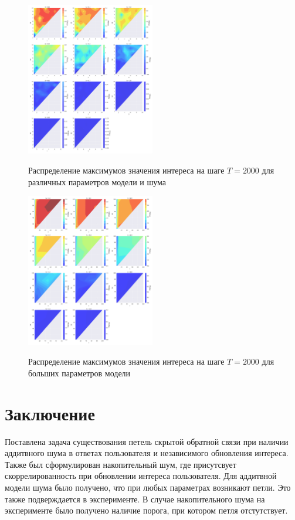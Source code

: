 \documentclass[12pt, twoside]{article}
\begin{document}
\begin{figure}[h]
  \begin{multicols}{2}
    \hfill
    \includegraphics[width=0.5\textwidth]{../figures/countour_Mlb.pdf}
    \hfill
    \caption{Распределение максимумов значения интереса на шаге $T=2000$ для различных параметров модели и шума}
    \label{fig5}
    \hfill
    \includegraphics[width=0.5\textwidth]{../figures/countour_big_Mlb.pdf}
    \hfill
    \caption{Распределение максимумов значения интереса на шаге $T=2000$ для больших параметров модели}
    \label{fig6}
  \end{multicols}
\end{figure}

\newpage

\section{Заключение}
Поставлена задача существования петель скрытой обратной связи при наличии аддитвного шума в ответах пользователя и независимого обновления интереса.
Также был сформулирован накопительный шум, где присутсвует скоррелированность при обновлении интереса пользователя.
Для аддитвной модели шума было получено, что при любых параметрах возникают петли. 
Это также подверждается в эксперименте.
В случае накопительного шума на эксперименте было получено наличие порога, при котором петля отстутствует.
\end{document}
